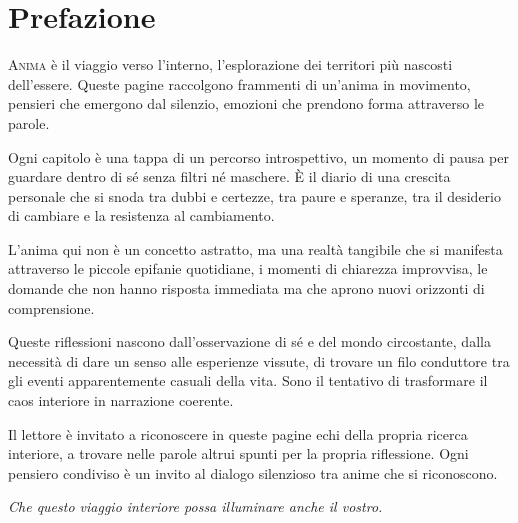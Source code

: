\chapter{Prefazione}

\lettrine{A}{nima} è il viaggio verso l'interno, l'esplorazione dei territori più nascosti dell'essere. Queste pagine raccolgono frammenti di un'anima in movimento, pensieri che emergono dal silenzio, emozioni che prendono forma attraverso le parole.

Ogni capitolo è una tappa di un percorso introspettivo, un momento di pausa per guardare dentro di sé senza filtri né maschere. È il diario di una crescita personale che si snoda tra dubbi e certezze, tra paure e speranze, tra il desiderio di cambiare e la resistenza al cambiamento.

L'anima qui non è un concetto astratto, ma una realtà tangibile che si manifesta attraverso le piccole epifanie quotidiane, i momenti di chiarezza improvvisa, le domande che non hanno risposta immediata ma che aprono nuovi orizzonti di comprensione.

Queste riflessioni nascono dall'osservazione di sé e del mondo circostante, dalla necessità di dare un senso alle esperienze vissute, di trovare un filo conduttore tra gli eventi apparentemente casuali della vita. Sono il tentativo di trasformare il caos interiore in narrazione coerente.

Il lettore è invitato a riconoscere in queste pagine echi della propria ricerca interiore, a trovare nelle parole altrui spunti per la propria riflessione. Ogni pensiero condiviso è un invito al dialogo silenzioso tra anime che si riconoscono.

\vspace{1em}
\textit{Che questo viaggio interiore possa illuminare anche il vostro.}

\cleardoublepage   %
